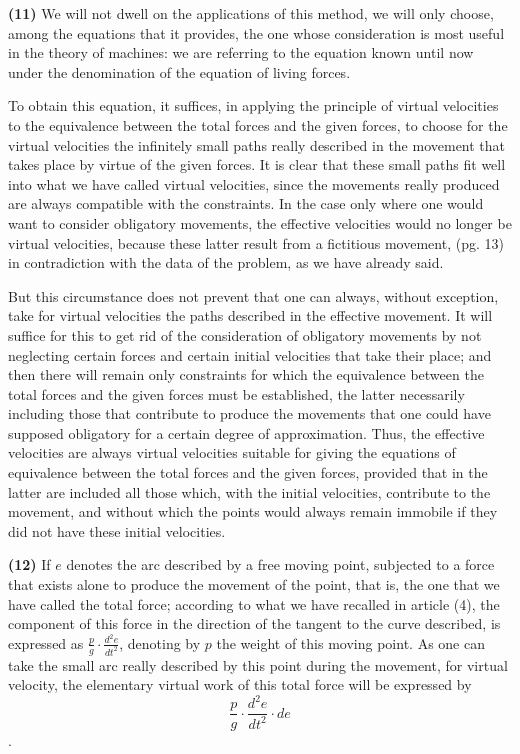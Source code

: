 \documentclass{book}
\begin{document}
\textbf{(11)} We will not dwell on the applications of this method, we will only choose, among the equations that it provides, the one whose consideration is most useful in the theory of machines: we are referring to the equation known until now under the denomination of the equation of living forces.

To obtain this equation, it suffices, in applying the principle of virtual velocities to the equivalence between the total forces and the given forces, to choose for the virtual velocities the infinitely small paths really described in the movement that takes place by virtue of the given forces. It is clear that these small paths fit well into what we have called virtual velocities, since the movements really produced are always compatible with the constraints. In the case only where one would want to consider obligatory movements, the effective velocities would no longer be virtual velocities, because these latter result from a fictitious movement, 
\newpage
(pg. 13)\\
in contradiction with the data of the problem, as we have already said.

But this circumstance does not prevent that one can always, without exception, take for virtual velocities the paths described in the effective movement. It will suffice for this to get rid of the consideration of obligatory movements by not neglecting certain forces and certain initial velocities that take their place; and then there will remain only constraints for which the equivalence between the total forces and the given forces must be established, the latter necessarily including those that contribute to produce the movements that one could have supposed obligatory for a certain degree of approximation. Thus, the effective velocities are always virtual velocities suitable for giving the equations of equivalence between the total forces and the given forces, provided that in the latter are included all those which, with the initial velocities, contribute to the movement, and without which the points would always remain immobile if they did not have these initial velocities.

\textbf{(12)} If \(e\) denotes the arc described by a free moving point, subjected to a force that exists alone to produce the movement of the point, that is, the one that we have called the total force; according to what we have recalled in article (4), the component of this force in the direction of the tangent to the curve described, is expressed as \(\frac{p}{g} \cdot \frac{d^2e}{dt^2}\), denoting by \(p\) the weight of this moving point. As one can take the small arc really described by this point during the movement, for virtual velocity, the elementary virtual work of this total force will be expressed by \[\frac{p}{g} \cdot \frac{d^2e}{dt^2} \cdot de\].
\end{document}
